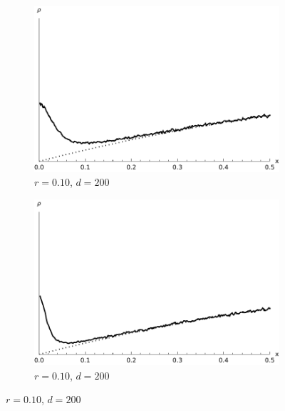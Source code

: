 \documentclass[a4paper,12pt,reqno,superscriptaddress,nofootinbib]{article}
\theoremstyle{plain}
\theoremstyle{definition}
\theoremstyle{remark}
\newcommand{\0}{^{(0)}}
\newcommand{\1}{^{(1)}}
\newcommand{\2}{^{(2)}}
\begin{document}
\begin{figure}
	\begin{subfigure}{0.48\textwidth}
		\includegraphics[width=\textwidth]{spd_r010_d100.pdf}
		\caption{$r=0.10$, $d=200$}
	\end{subfigure}\hfill
	\begin{subfigure}{0.48\textwidth}
		\includegraphics[width=\textwidth]{spd_r010_d200.pdf}
		\caption{$r=0.10$, $d=200$}
	\end{subfigure}


\end{figure}
\end{document}
